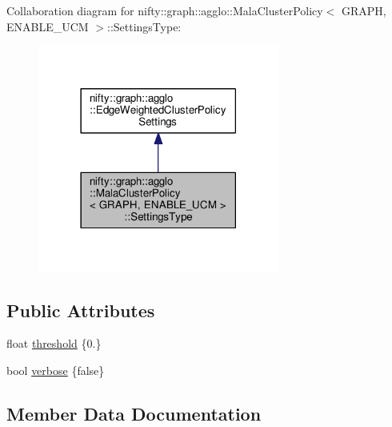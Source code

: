 Collaboration diagram for nifty\+:\+:graph\+:\+:agglo\+:\+:Mala\+Cluster\+Policy$<$ G\+R\+A\+P\+H, E\+N\+A\+B\+L\+E\+\_\+\+U\+C\+M $>$\+:\+:Settings\+Type\+:\nopagebreak
\begin{figure}[H]
\begin{center}
\leavevmode
\includegraphics[width=225pt]{structnifty_1_1graph_1_1agglo_1_1MalaClusterPolicy_1_1SettingsType__coll__graph}
\end{center}
\end{figure}
\subsection*{Public Attributes}
\begin{DoxyCompactItemize}
\item 
float \hyperlink{structnifty_1_1graph_1_1agglo_1_1MalaClusterPolicy_1_1SettingsType_a3008e5ea72da713e65c96cea6fb391a5}{threshold} \{0.\}
\item 
bool \hyperlink{structnifty_1_1graph_1_1agglo_1_1MalaClusterPolicy_1_1SettingsType_a08b914f330c857e63fbff87edb429a2e}{verbose} \{false\}
\end{DoxyCompactItemize}


\subsection{Member Data Documentation}
\hypertarget{structnifty_1_1graph_1_1agglo_1_1MalaClusterPolicy_1_1SettingsType_a3008e5ea72da713e65c96cea6fb391a5}{}
